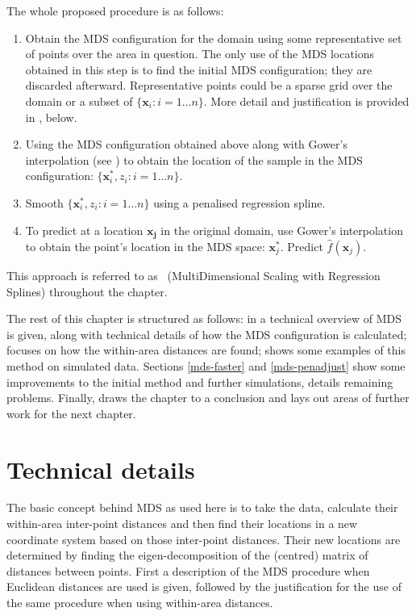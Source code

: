 The whole proposed procedure is as follows:

\begin{enumerate}
\item Obtain the MDS configuration for the domain using some representative set of points over the area in question. The only use of the MDS locations obtained in this step is to find the initial MDS configuration; they are discarded afterward. Representative points could be a sparse grid over the domain or a subset of $\{\mathbf{x}_i : i=1\dots n\}$. More detail and justification is provided in , below.

\item Using the MDS configuration obtained above along with Gower's interpolation (see ) to obtain the location of the sample in the MDS configuration: $\{\mathbf{x}_i^*, z_i : i=1\dots n\}$.

\item Smooth $\{\mathbf{x}_i^*, z_i : i=1\dots n\}$ using a penalised regression spline.

\item To predict at a location $\mathbf{x_j}$ in the original domain, use Gower's interpolation to obtain the point's location in the MDS space: $\mathbf{x}_j^*$. Predict $\hat{f}(\mathbf{x}_j)$.
\end{enumerate}

This approach is referred to as \mdsap\ (MultiDimensional Scaling with Regression Splines) throughout the chapter.

The rest of this chapter is structured as follows: in  a technical overview of MDS is given, along with technical details of how the MDS configuration is calculated;  focuses on how the within-area distances are found;  shows some examples of this method on simulated data. Sections \ref{mds-faster} and \ref{mds-penadjust} show some improvements to the initial method and further simulations,  details remaining problems. Finally,  draws the chapter to a conclusion and lays out areas of further work for the next chapter.


\section{Technical details}
\label{MDStechdet}

The basic concept behind MDS as used here is to take the data, calculate their within-area inter-point distances and then find their locations in a new coordinate system based on those inter-point distances. Their new locations are determined by finding the eigen-decomposition of the (centred) matrix of distances between points. First a description of the MDS procedure when Euclidean distances are used is given, followed by the justification for the use of the same procedure when using within-area distances. 

